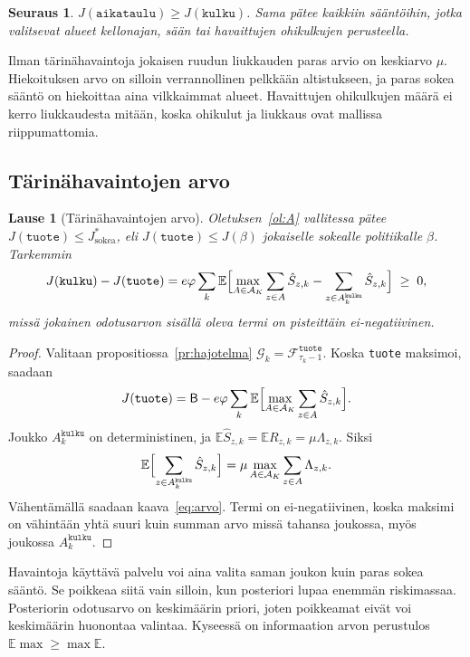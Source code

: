 \documentclass[11pt,a4paper]{article}
\theoremstyle{plain}
\newtheorem{lause}{Lause}
\newtheorem{seuraus}{Seuraus}
\theoremstyle{definition}
\theoremstyle{remark}
\newcommand{\E}{\mathbb{E}}
\newcommand{\cF}{\mathcal{F}}
\newcommand{\cG}{\mathcal{G}}
\newcommand{\cA}{\mathcal{A}}
\newcommand{\1}{\mathbf{1}}
\newcommand{\pol}[1]{\texttt{#1}}
\begin{document}
\begin{seuraus}
$J(\pol{aikataulu}) \ge J(\pol{kulku})$. Sama pätee kaikkiin sääntöihin, jotka
valitsevat alueet kellonajan, sään tai havaittujen ohikulkujen perusteella.
\end{seuraus}

\begin{intuitio}
Ilman tärinähavaintoja jokaisen ruudun liukkauden paras arvio on keskiarvo
$\mu$. Hiekoituksen arvo on silloin verrannollinen pelkkään altistukseen, ja
paras sokea sääntö on hiekoittaa aina vilkkaimmat alueet. Havaittujen
ohikulkujen määrä ei kerro liukkaudesta mitään, koska ohikulut ja liukkaus
ovat mallissa riippumattomia.
\end{intuitio}

\subsection{Tärinähavaintojen arvo}

\begin{lause}[Tärinähavaintojen arvo]\label{la:arvo}
Oletuksen~\ref{ol:A} vallitessa pätee $J(\pol{tuote}) \le J^\ast_{\mathrm{sokea}}$,
eli $J(\pol{tuote}) \le J(\beta)$ jokaiselle sokealle politiikalle $\beta$.
Tarkemmin
\begin{equation}\label{eq:arvo}
  J(\pol{kulku}) - J(\pol{tuote}) = e\varphi \sum_{k} \E\Bigl[\max_{A \in \cA_K} \sum_{z \in A} \hat S_{z,k}
  - \sum_{z \in A^{\pol{kulku}}_k} \hat S_{z,k}\Bigr] \;\ge\; 0,
\end{equation}
missä jokainen odotusarvon sisällä oleva termi on pisteittäin ei-negatiivinen.
\end{lause}

\begin{proof}
Valitaan propositiossa~\ref{pr:hajotelma} $\cG_k = \cF^{\pol{tuote}}_{\tau_k - 1}$.
Koska \pol{tuote} maksimoi, saadaan
\[
  J(\pol{tuote}) = \mathsf{B} - e\varphi \sum_k \E\Bigl[\max_{A \in \cA_K}\sum_{z \in A}\hat S_{z,k}\Bigr].
\]
Joukko $A^{\pol{kulku}}_k$ on deterministinen, ja
$\E \hat S_{z,k} = \E R_{z,k} = \mu \Lambda_{z,k}$. Siksi
\[
  \E\Bigl[\sum_{z \in A^{\pol{kulku}}_k} \hat S_{z,k}\Bigr] = \mu \max_{A \in \cA_K}\sum_{z \in A}\Lambda_{z,k}.
\]
Vähentämällä saadaan kaava~\eqref{eq:arvo}. Termi on ei-negatiivinen, koska
maksimi on vähintään yhtä suuri kuin summan arvo missä tahansa joukossa, myös
joukossa $A^{\pol{kulku}}_k$.
\end{proof}

\begin{intuitio}
Havaintoja käyttävä palvelu voi aina valita saman joukon kuin paras sokea
sääntö. Se poikkeaa siitä vain silloin, kun posteriori lupaa enemmän
riskimassaa. Posteriorin odotusarvo on keskimäärin priori, joten poikkeamat
eivät voi keskimäärin huonontaa valintaa. Kyseessä on informaation arvon
perustulos $\E \max \ge \max \E$.
\end{intuitio}
\end{document}
